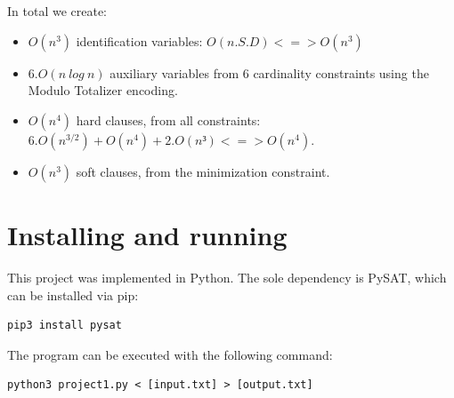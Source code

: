 \documentclass[sigconf, 11pt]{acmart}
\begin{document}
In total we create:
\begin{itemize}
    \item $O(n^3)$ identification variables: $O(n.S.D) <=> O(n^3)$
    \item $6.O(n \ log \ n)$ auxiliary variables from 6 cardinality constraints using the Modulo Totalizer encoding.
    \item $O(n^4)$ hard clauses, from all constraints: $6.O(n^{3/2}) + O(n^4)+2.O(n³) <=> O(n^4)$.
    \item $O(n^3)$ soft clauses, from the minimization constraint.
\end{itemize}

\section{Installing and running}
This project was implemented in Python. The sole dependency is PySAT, which can be installed via pip:
\begin{verbatim}
pip3 install pysat
\end{verbatim}
The program can be executed with the following command:
\begin{verbatim}
python3 project1.py < [input.txt] > [output.txt]
\end{verbatim}




\newpage
\end{document}
